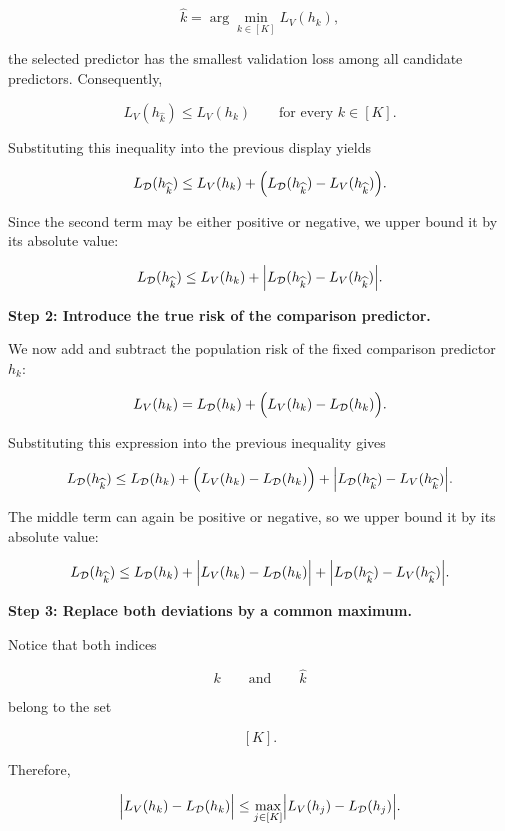 \documentclass[11pt]{article}
\begin{document}
\begin{enumerate}
\begin{solutionbox}
\[
\widehat{k}
=
\arg\min_{k\in[K]}
L_V(h_k),
\]

the selected predictor has the smallest validation loss among all candidate predictors. Consequently,

\[
L_V(h_{\widehat{k}})
\le
L_V(h_k)
\qquad
\text{for every }
k\in[K].
\]

Substituting this inequality into the previous display yields

\[
L_{\mathcal D}(h_{\widehat{k}})
\le
L_V(h_k)
+
\Bigl(
L_{\mathcal D}(h_{\widehat{k}})
-
L_V(h_{\widehat{k}})
\Bigr).
\]

Since the second term may be either positive or negative, we upper bound it by its absolute value:

\[
L_{\mathcal D}(h_{\widehat{k}})
\le
L_V(h_k)
+
\Bigl|
L_{\mathcal D}(h_{\widehat{k}})
-
L_V(h_{\widehat{k}})
\Bigr|.
\]

\medskip

\textbf{Step 2: Introduce the true risk of the comparison predictor.}

We now add and subtract the population risk of the fixed comparison predictor \(h_k\):

\[
L_V(h_k)
=
L_{\mathcal D}(h_k)
+
\Bigl(
L_V(h_k)
-
L_{\mathcal D}(h_k)
\Bigr).
\]

Substituting this expression into the previous inequality gives

\[
L_{\mathcal D}(h_{\widehat{k}})
\le
L_{\mathcal D}(h_k)
+
\Bigl(
L_V(h_k)
-
L_{\mathcal D}(h_k)
\Bigr)
+
\Bigl|
L_{\mathcal D}(h_{\widehat{k}})
-
L_V(h_{\widehat{k}})
\Bigr|.
\]

The middle term can again be positive or negative, so we upper bound it by its absolute value:

\[
L_{\mathcal D}(h_{\widehat{k}})
\le
L_{\mathcal D}(h_k)
+
\Bigl|
L_V(h_k)
-
L_{\mathcal D}(h_k)
\Bigr|
+
\Bigl|
L_{\mathcal D}(h_{\widehat{k}})
-
L_V(h_{\widehat{k}})
\Bigr|.
\]

\medskip

\textbf{Step 3: Replace both deviations by a common maximum.}

Notice that both indices

\[
k
\qquad\text{and}\qquad
\widehat{k}
\]

belong to the set

\[
[K].
\]

Therefore,

\[
\Bigl|
L_V(h_k)
-
L_{\mathcal D}(h_k)
\Bigr|
\le
\max_{j\in[K]}
\Bigl|
L_V(h_j)
-
L_{\mathcal D}(h_j)
\Bigr|.
\]


\end{solutionbox}
\end{enumerate}
\end{document}
